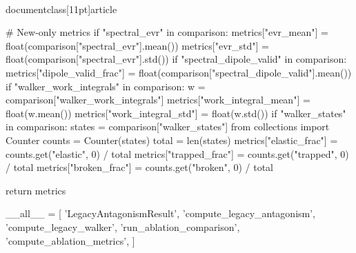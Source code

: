 \\documentclass[11pt]{article}
\begin{document}
\begin{CodeBlock}
    # New-only metrics
    if "spectral_evr" in comparison:
        metrics["evr_mean"] = float(comparison["spectral_evr"].mean())
        metrics["evr_std"] = float(comparison["spectral_evr"].std())
    if "spectral_dipole_valid" in comparison:
        metrics["dipole_valid_frac"] = float(comparison["spectral_dipole_valid"].mean())
    if "walker_work_integrals" in comparison:
        w = comparison["walker_work_integrals"]
        metrics["work_integral_mean"] = float(w.mean())
        metrics["work_integral_std"] = float(w.std())
    if "walker_states" in comparison:
        states = comparison["walker_states"]
        from collections import Counter
        counts = Counter(states)
        total = len(states)
        metrics["elastic_frac"] = counts.get("elastic", 0) / total
        metrics["trapped_frac"] = counts.get("trapped", 0) / total
        metrics["broken_frac"] = counts.get("broken", 0) / total

    return metrics


__all__ = [
    'LegacyAntagonismResult',
    'compute_legacy_antagonism',
    'compute_legacy_walker',
    'run_ablation_comparison',
    'compute_ablation_metrics',
]

\end{CodeBlock}
\end{document}
